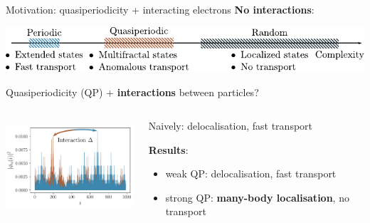 \begin{frame}{Motivation: quasiperiodicity + interacting electrons}
\textbf{No interactions}:

{
\centering
\includegraphics[width=\textwidth]{img/1_motivation/complexity.pdf}

}

Quasiperiodicity (QP) + \textbf{interactions} between particles?

\begin{columns}
\begin{column}{0.4\textwidth}
\centering
\includegraphics[height=3.5cm]{img/0_cover/free_two_densities_interaction}
\end{column}
\begin{column}{0.6\textwidth}

Naively: delocalisation, fast transport

\textbf{Results}: 
\begin{itemize}
	\item weak QP: delocalisation, fast transport
	\item strong QP: \textbf{many-body localisation}, no transport
\end{itemize}
\end{column}
\end{columns}
\end{frame}